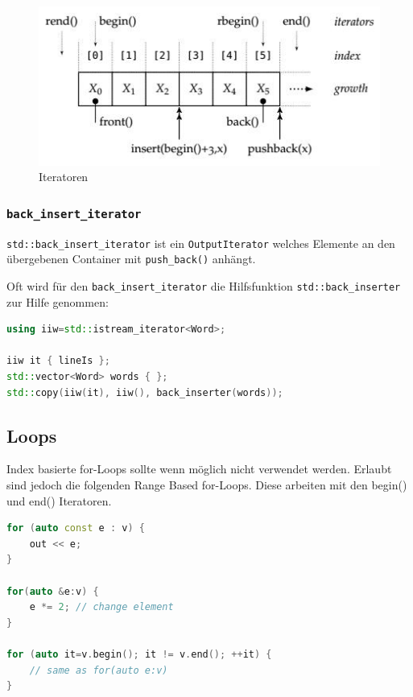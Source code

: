 \begin{figure}[h]
	\centering
	\includegraphics[width=0.7\linewidth]{images/iterator}
	\caption{Iteratoren}
	\label{fig:iterator}
\end{figure}

\subsubsection{\lstinline|back_insert_iterator|}
\lstinline|std::back_insert_iterator| ist ein \lstinline|OutputIterator| welches Elemente an den übergebenen Container mit \lstinline|push_back()| anhängt.

Oft wird für den \lstinline|back_insert_iterator| die Hilfsfunktion \lstinline|std::back_inserter| zur Hilfe genommen:

\begin{lstlisting}[language=C++]
using iiw=std::istream_iterator<Word>;

iiw it { lineIs };
std::vector<Word> words { };
std::copy(iiw(it), iiw(), back_inserter(words));

\end{lstlisting}

\clearpage

\subsection{Loops}
Index basierte for-Loops sollte wenn möglich nicht verwendet werden. Erlaubt sind jedoch die folgenden Range Based for-Loops. Diese arbeiten mit den begin() und end() Iteratoren.
\begin{lstlisting}[language=C++]
for (auto const e : v) {
	out << e;
}

for(auto &e:v) {
	e *= 2; // change element
}

for (auto it=v.begin(); it != v.end(); ++it) {
	// same as for(auto e:v)
}
\end{lstlisting}

	
